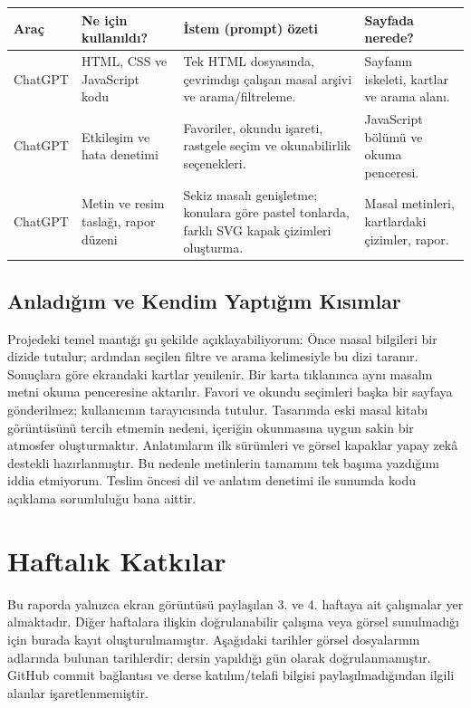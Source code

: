 \documentclass[12pt,a4paper]{article}
\begin{document}
\begin{longtable}{@{}p{2.6cm}p{3.6cm}p{4.2cm}p{3.4cm}@{}}
\toprule
\textbf{Araç} & \textbf{Ne için kullanıldı?} & \textbf{İstem (prompt) özeti} & \textbf{Sayfada nerede?} \\
\midrule
\endhead
ChatGPT & HTML, CSS ve JavaScript kodu & Tek HTML dosyasında, çevrimdışı çalışan masal arşivi ve arama/filtreleme. & Sayfanın iskeleti, kartlar ve arama alanı. \\
ChatGPT & Etkileşim ve hata denetimi & Favoriler, okundu işareti, rastgele seçim ve okunabilirlik seçenekleri. & JavaScript bölümü ve okuma penceresi. \\
ChatGPT & Metin ve resim taslağı, rapor düzeni & Sekiz masalı genişletme; konulara göre pastel tonlarda, farklı SVG kapak çizimleri oluşturma. & Masal metinleri, kartlardaki çizimler, rapor. \\
\bottomrule
\end{longtable}

\subsection{Anladığım ve Kendim Yaptığım Kısımlar}
Projedeki temel mantığı şu şekilde açıklayabiliyorum: Önce masal bilgileri bir dizide tutulur; ardından seçilen filtre ve arama kelimesiyle bu dizi taranır. Sonuçlara göre ekrandaki kartlar yenilenir. Bir karta tıklanınca aynı masalın metni okuma penceresine aktarılır. Favori ve okundu seçimleri başka bir sayfaya gönderilmez; kullanıcının tarayıcısında tutulur. Tasarımda eski masal kitabı görüntüsünü tercih etmemin nedeni, içeriğin okunmasına uygun sakin bir atmosfer oluşturmaktır. Anlatımların ilk sürümleri ve görsel kapaklar yapay zekâ destekli hazırlanmıştır. Bu nedenle metinlerin tamamını tek başıma yazdığımı iddia etmiyorum. Teslim öncesi dil ve anlatım denetimi ile sunumda kodu açıklama sorumluluğu bana aittir.

\section{Haftalık Katkılar}
Bu raporda yalnızca ekran görüntüsü paylaşılan 3. ve 4. haftaya ait çalışmalar yer almaktadır. Diğer haftalara ilişkin doğrulanabilir çalışma veya görsel sunulmadığı için burada kayıt oluşturulmamıştır. Aşağıdaki tarihler görsel dosyalarının adlarında bulunan tarihlerdir; dersin yapıldığı gün olarak doğrulanmamıştır. GitHub commit bağlantısı ve derse katılım/telafi bilgisi paylaşılmadığından ilgili alanlar işaretlenmemiştir.
\end{document}
